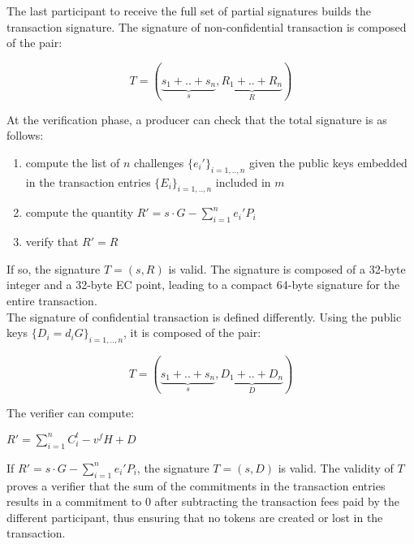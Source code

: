 The last participant to receive the full set of partial signatures builds the transaction signature. The signature of non-confidential transaction is composed of the pair:

\begin{equation} 
T= (\underbrace{s_{1}+..+s_{n}}_{s}, \underbrace{R_{1}+..+R_{n}}_{R})
\end{equation}

At the verification phase, a producer can check that the total signature is as follows:

\begin{enumerate}
\item compute the list of $n$ challenges $\{e_i'\}_{i=1,..,n}$ given the public keys embedded in the transaction entries $\{E_i\}_{i=1,..,n}$ included in $m$
\item compute the quantity $R' = s \cdot G - \sum_{i=1}^{n}e_i'P_i$
\item verify that $R'=R$
\end{enumerate}

If so, the signature $T = (s,R)$ is valid. The signature is composed of a 32-byte integer and a 32-byte EC point, leading to a compact 64-byte signature for the entire transaction. \\

The signature of confidential transaction is defined differently. Using the public keys $\{D_i = d_iG\}_{i=1,..,n}$, it is composed of the pair:

\begin{equation} 
T= (\underbrace{s_{1}+..+s_{n}}_{s}, \underbrace{D_{1}+..+D_{n}}_{D})
\end{equation}

The verifier can compute:

\begin{center}
$R' = \sum_{i=1}^{n}C_i^t - v^fH + D$
\end{center}

If $R' = s \cdot G - \sum_{i=1}^{n}e_i'P_i$, the signature $T = (s,D)$ is valid. The validity of $T$ proves a verifier that the sum of the commitments in the transaction entries results in a commitment to 0 after subtracting the transaction fees paid by the different participant, thus ensuring that no tokens are created or lost in the transaction. 
